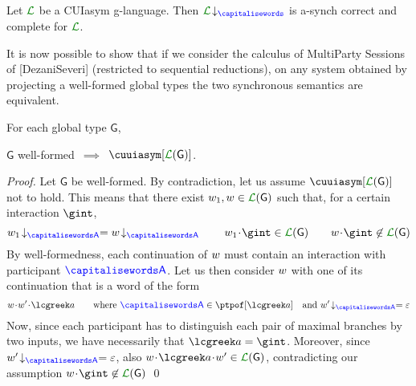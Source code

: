 %
%
% 
% 
%



\begin{corollary}
Let $\clang$ be a CUIasym g-language. Then $\proj{\clang}{}$ is a-synch correct and complete for $\clang$.
\end{corollary}


It is now possible to show that if we consider the calculus of MultiParty Sessions of [DezaniSeveri]
(restricted to sequential reductions), on any system obtained by projecting a well-formed 
global types the two synchronous semantics are equivalent.


\begin{proposition}
For each global type ${\mathsf G}$,\\
\centerline{${\mathsf G}$ well-formed\ $\implies$\ $\cuuiasym[{\clang({\mathsf G})}]$.}
\end{proposition}

\begin{proof}
Let ${\mathsf G}$ be well-formed.
By contradiction, let us assume $\cuuiasym[{\clang({\mathsf G})}]$ not to hold.
This means that there exist $\acword_1,\acword\in\clang({\mathsf G})$ such that, for a certain
interaction $\gint$,
$$
\proj{\acword_1}{A} = \proj{\acword}{A}      \qquad      \acword_1\cat\gint\in\clang({\mathsf G})   
\qquad \acword\cat\gint\not\in\clang({\mathsf G})
$$
By well-formedness, each continuation of $w$ must contain an interaction with participant $\p$.
Let us then consider $w$ with one of its  continuation that is a word of the form
$$
\acword\cat\acword'\cat \aint \qquad \text{where } \p\in\ptpof[\aint] \quad \text{and }\proj{\acword'}{A}=\emptyword
$$
Now, since each participant has to distinguish each pair of maximal branches by two inputs,
we have necessarily that $\aint=\gint$. Moreover, since  $\proj{\acword'}{A}=\emptyword$,
also $\acword\cat \aint\cat\acword'\in\clang({\mathsf G}) $, contradicting our assumption
$\acword\cat\gint\not\in\clang({\mathsf G})$
\qed
\end{proof}


